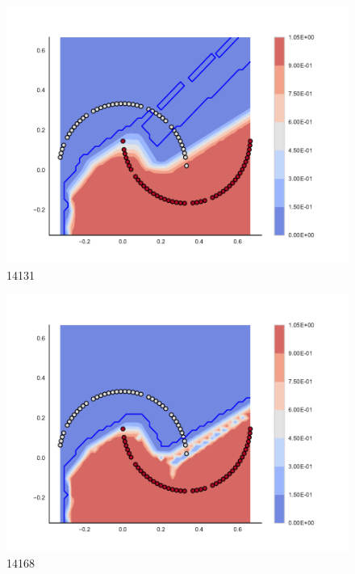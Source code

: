 \begin{subfigure}[b]{0.09\textwidth}
    \includegraphics[clip, trim=2.35cm 1.75cm 4.5cm 0cm,width=\textwidth]{img/convergence/14131.pdf}
    \caption{14131}
    \label{fig:convergence_14131}
\end{subfigure}
%
\begin{subfigure}[b]{0.09\textwidth}
    \includegraphics[clip, trim=2.35cm 1.75cm 4.5cm 0cm,width=\textwidth]{img/convergence/14168.pdf}
    \caption{14168}
    \label{fig:convergence_14168}
\end{subfigure}
%
